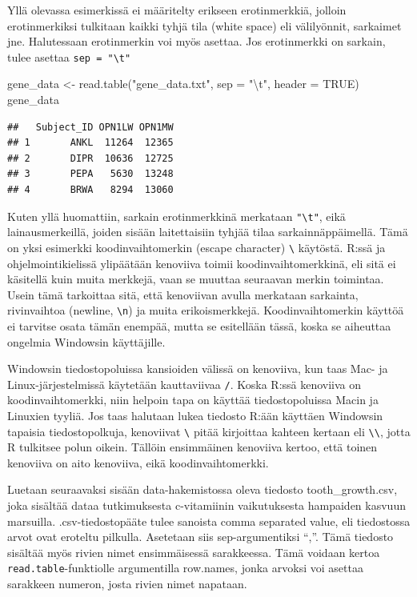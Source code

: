 \documentclass[
]{book}
\newenvironment{Shaded}{\begin{snugshade}}{\end{snugshade}}
\newcommand{\AttributeTok}[1]{\textcolor[rgb]{0.77,0.63,0.00}{#1}}
\newcommand{\ConstantTok}[1]{\textcolor[rgb]{0.00,0.00,0.00}{#1}}
\newcommand{\FunctionTok}[1]{\textcolor[rgb]{0.00,0.00,0.00}{#1}}
\newcommand{\NormalTok}[1]{#1}
\newcommand{\OtherTok}[1]{\textcolor[rgb]{0.56,0.35,0.01}{#1}}
\newcommand{\SpecialCharTok}[1]{\textcolor[rgb]{0.00,0.00,0.00}{#1}}
\newcommand{\StringTok}[1]{\textcolor[rgb]{0.31,0.60,0.02}{#1}}
\begin{document}
Yllä olevassa esimerkissä ei määritelty erikseen erotinmerkkiä, jolloin erotinmerkiksi tulkitaan kaikki tyhjä tila (white space) eli välilyönnit, sarkaimet jne. Halutessaan erotinmerkin voi myös asettaa. Jos erotinmerkki on sarkain, tulee asettaa \texttt{sep\ =\ "\textbackslash{}t"}

\begin{Shaded}
\begin{Highlighting}[]
\NormalTok{gene\_data }\OtherTok{\textless{}{-}} \FunctionTok{read.table}\NormalTok{(}\StringTok{"gene\_data.txt"}\NormalTok{, }\AttributeTok{sep =} \StringTok{"}\SpecialCharTok{\textbackslash{}t}\StringTok{"}\NormalTok{, }\AttributeTok{header =} \ConstantTok{TRUE}\NormalTok{)}
\NormalTok{gene\_data}
\end{Highlighting}
\end{Shaded}

\begin{verbatim}
##   Subject_ID OPN1LW OPN1MW
## 1       ANKL  11264  12365
## 2       DIPR  10636  12725
## 3       PEPA   5630  13248
## 4       BRWA   8294  13060
\end{verbatim}

Kuten yllä huomattiin, sarkain erotinmerkkinä merkataan \texttt{"\textbackslash{}t"}, eikä lainausmerkeillä, joiden sisään laitettaisiin tyhjää tilaa sarkainnäppäimellä. Tämä on yksi esimerkki koodinvaihtomerkin (escape character) \texttt{\textbackslash{}} käytöstä. R:ssä ja ohjelmointikielissä ylipäätään kenoviiva toimii koodinvaihtomerkkinä, eli sitä ei käsitellä kuin muita merkkejä, vaan se muuttaa seuraavan merkin toimintaa. Usein tämä tarkoittaa sitä, että kenoviivan avulla merkataan sarkainta, rivinvaihtoa (newline, \texttt{\textbackslash{}n}) ja muita erikoismerkkejä. Koodinvaihtomerkin käyttöä ei tarvitse osata tämän enempää, mutta se esitellään tässä, koska se aiheuttaa ongelmia Windowsin käyttäjille.

Windowsin tiedostopoluissa kansioiden välissä on kenoviiva, kun taas Mac- ja Linux-järjestelmissä käytetään kauttaviivaa \texttt{/}. Koska R:ssä kenoviiva on koodinvaihtomerkki, niin helpoin tapa on käyttää tiedostopoluissa Macin ja Linuxien tyyliä. Jos taas halutaan lukea tiedosto R:ään käyttäen Windowsin tapaisia tiedostopolkuja, kenoviivat \texttt{\textbackslash{}} pitää kirjoittaa kahteen kertaan eli \texttt{\textbackslash{}\textbackslash{}}, jotta R tulkitsee polun oikein. Tällöin ensimmäinen kenoviiva kertoo, että toinen kenoviiva on aito kenoviiva, eikä koodinvaihtomerkki.

Luetaan seuraavaksi sisään data-hakemistossa oleva tiedosto tooth\_growth.csv, joka sisältää dataa tutkimuksesta c-vitamiinin vaikutuksesta hampaiden kasvuun marsuilla. .csv-tiedostopääte tulee sanoista comma separated value, eli tiedostossa arvot ovat eroteltu pilkulla. Asetetaan siis sep-argumentiksi ``,''. Tämä tiedosto sisältää myös rivien nimet ensimmäisessä sarakkeessa. Tämä voidaan kertoa \texttt{read.table}-funktiolle argumentilla row.names, jonka arvoksi voi asettaa sarakkeen numeron, josta rivien nimet napataan.
\end{document}
